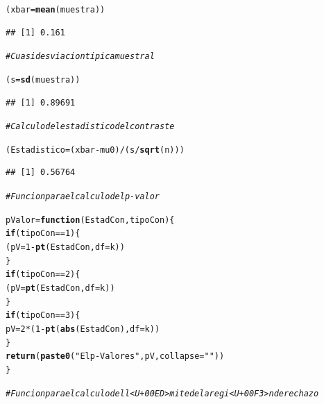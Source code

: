 \documentclass[10pt,a4paper]{article}\usepackage[]{graphicx}\usepackage[]{color}
\makeatletter
\newcommand{\hlnum}[1]{\textcolor[rgb]{0.686,0.059,0.569}{#1}}%
\newcommand{\hlstr}[1]{\textcolor[rgb]{0.192,0.494,0.8}{#1}}%
\newcommand{\hlcom}[1]{\textcolor[rgb]{0.678,0.584,0.686}{\textit{#1}}}%
\newcommand{\hlopt}[1]{\textcolor[rgb]{0,0,0}{#1}}%
\newcommand{\hlstd}[1]{\textcolor[rgb]{0.345,0.345,0.345}{#1}}%
\newcommand{\hlkwa}[1]{\textcolor[rgb]{0.161,0.373,0.58}{\textbf{#1}}}%
\newcommand{\hlkwb}[1]{\textcolor[rgb]{0.69,0.353,0.396}{#1}}%
\newcommand{\hlkwc}[1]{\textcolor[rgb]{0.333,0.667,0.333}{#1}}%
\newcommand{\hlkwd}[1]{\textcolor[rgb]{0.737,0.353,0.396}{\textbf{#1}}}%
\newenvironment{kframe}{%
 \def\at@end@of@kframe{}%
 \ifinner\ifhmode%
  \def\at@end@of@kframe{\end{minipage}}%
  \begin{minipage}{\columnwidth}%
 \fi\fi%
 \def\FrameCommand##1{\hskip\@totalleftmargin \hskip-\fboxsep
 \colorbox{shadecolor}{##1}\hskip-\fboxsep
     \hskip-\linewidth \hskip-\@totalleftmargin \hskip\columnwidth}%
 \MakeFramed {\advance\hsize-\width
   \@totalleftmargin\z@ \linewidth\hsize
   \@setminipage}}%
 {\par\unskip\endMakeFramed%
 \at@end@of@kframe}
\newenvironment{knitrout}{}{} %
\newcounter {cont01}
\makeatother
\begin{document}
\begin{knitrout}
\begin{kframe}
\begin{alltt}
\hlstd{(xbar} \hlkwb{=} \hlkwd{mean}\hlstd{(muestra))}
\end{alltt}
\begin{verbatim}
## [1] 0.161
\end{verbatim}
\begin{alltt}
\hlcom{# Cuasidesviacion tipica muestral}

\hlstd{(s} \hlkwb{=} \hlkwd{sd}\hlstd{(muestra))}
\end{alltt}
\begin{verbatim}
## [1] 0.89691
\end{verbatim}
\begin{alltt}
\hlcom{# Calculo del estadistico del contraste}

\hlstd{(Estadistico} \hlkwb{=} \hlstd{(xbar} \hlopt{-} \hlstd{mu0)} \hlopt{/} \hlstd{(s}\hlopt{/}\hlkwd{sqrt}\hlstd{(n)))}
\end{alltt}
\begin{verbatim}
## [1] 0.56764
\end{verbatim}
\begin{alltt}
\hlcom{# Funcion para el calculo del p-valor}

 \hlstd{pValor} \hlkwb{=} \hlkwa{function}\hlstd{(}\hlkwc{EstadCon}\hlstd{,} \hlkwc{tipoCon}\hlstd{)\{}
      \hlkwa{if}\hlstd{(tipoCon} \hlopt{==} \hlnum{1}\hlstd{)\{}
        \hlstd{(pV} \hlkwb{=} \hlnum{1} \hlopt{-} \hlkwd{pt}\hlstd{(EstadCon,} \hlkwc{df}\hlstd{=k ))}
      \hlstd{\}}
      \hlkwa{if}\hlstd{(tipoCon} \hlopt{==} \hlnum{2}\hlstd{)\{}
        \hlstd{(pV} \hlkwb{=} \hlkwd{pt}\hlstd{(EstadCon,} \hlkwc{df}\hlstd{=k ))}
      \hlstd{\}}
      \hlkwa{if}\hlstd{(tipoCon} \hlopt{==} \hlnum{3}\hlstd{)\{}
        \hlstd{pV} \hlkwb{=} \hlnum{2} \hlopt{*} \hlstd{(}\hlnum{1} \hlopt{-} \hlkwd{pt}\hlstd{(}\hlkwd{abs}\hlstd{(EstadCon),} \hlkwc{df}\hlstd{=k ))}
      \hlstd{\}}
      \hlkwd{return}\hlstd{(}\hlkwd{paste0}\hlstd{(}\hlstr{"El p-Valor es "}\hlstd{, pV,} \hlkwc{collapse}\hlstd{=}\hlstr{""}\hlstd{))}
    \hlstd{\}}

\hlcom{# Funcion para el calculo del l<U+00ED>mite de la regi<U+00F3>n de rechazo}


\end{alltt}
\end{kframe}
\end{knitrout}
\end{document}
